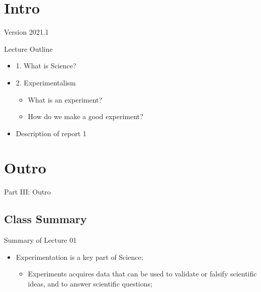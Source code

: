 \documentclass[aspectratio=169]{beamer}
\subtitle[Experimentalism]{Topic 01 - What is an experiment?}
\begin{document}
\begin{CJK}{UTF8}{ipxm}

\section{Intro}
\begin{frame}
  \maketitle

  \vfill

  \hfill Version 2021.1
\end{frame}

\begin{frame}{Lecture Outline}
  \begin{itemize}
    \item 1. What is Science?\bigskip

    \item 2. Experimentalism
    \begin{itemize}
      \item What is an experiment?
      \item How do we make a good experiment?
    \end{itemize}\bigskip

    \item Description of report 1
  \end{itemize}
\end{frame}




\section{Outro}

\begin{frame}
  \begin{center}
    Part III: Outro
  \end{center}
\end{frame}

\subsection{Class Summary}
\begin{frame}{Summary of Lecture 01}
  \begin{itemize}
    \item Experimentation is a key part of Science;
    \begin{itemize}
      \item Experiments acquires data that can be used to validate or falsify scientific ideas, and to answer scientific questions;
    \end{itemize}
    \bigskip


\end{itemize}
\end{frame}
\end{CJK}
\end{document}
